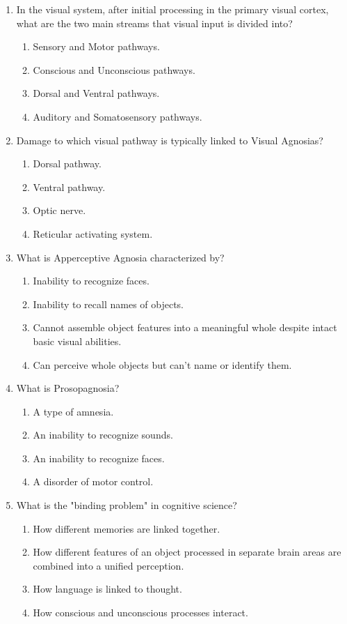 \documentclass{article}
\begin{document}
\begin{enumerate}[label=\arabic*.]
\item In the visual system, after initial processing in the primary visual cortex, what are the two main streams that visual input is divided into?
\begin{enumerate}[label=(\alph*)]
    \item Sensory and Motor pathways.
    \item Conscious and Unconscious pathways.
    \item Dorsal and Ventral pathways.
    \item Auditory and Somatosensory pathways.
\end{enumerate}

\item Damage to which visual pathway is typically linked to Visual Agnosias?
\begin{enumerate}[label=(\alph*)]
    \item Dorsal pathway.
    \item Ventral pathway.
    \item Optic nerve.
    \item Reticular activating system.
\end{enumerate}

\item What is Apperceptive Agnosia characterized by?
\begin{enumerate}[label=(\alph*)]
    \item Inability to recognize faces.
    \item Inability to recall names of objects.
    \item Cannot assemble object features into a meaningful whole despite intact basic visual abilities.
    \item Can perceive whole objects but can't name or identify them.
\end{enumerate}

\item What is Prosopagnosia?
\begin{enumerate}[label=(\alph*)]
    \item A type of amnesia.
    \item An inability to recognize sounds.
    \item An inability to recognize faces.
    \item A disorder of motor control.
\end{enumerate}

\item What is the "binding problem" in cognitive science?
\begin{enumerate}[label=(\alph*)]
    \item How different memories are linked together.
    \item How different features of an object processed in separate brain areas are combined into a unified perception.
    \item How language is linked to thought.
    \item How conscious and unconscious processes interact.
\end{enumerate}


\end{enumerate}
\end{document}
